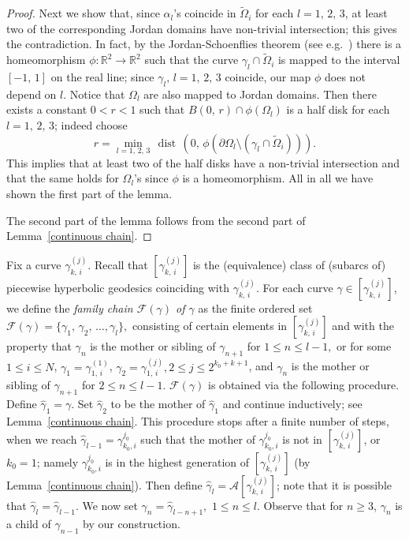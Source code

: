 \documentclass[reqno,11pt]{amsart}
\def\az{\alpha}
\def\dist{{\mathop\mathrm{\,dist\,}}}
\def\wz{\widetilde}
\numberwithin{equation}{section}
\theoremstyle{remark}
\begin{document}
\begin{proof}
Next we show that, since $\az_l$'s coincide in $\wz \Omega_i$ for each $l=1,\,2,\,3$, at least two of the corresponding Jordan domains have non-trivial intersection; this gives the contradiction. In fact, by the Jordan-Schoenflies theorem (see e.g.\ \cite{T1992}) there is a homeomorphism 
$\phi\colon\mathbb R^2\to\mathbb R^2$ such that the curve $\gamma_l\cap \wz \Omega_i$ is mapped to the  interval $[-1,\,1]$ on the real line; since $\gamma_l,\,l=1,\,2,\,3$ coincide, our map $\phi$ does not depend on $l$. Notice that $\Omega_l$ are also mapped to Jordan domains. Then there exists a constant $0<r<1$ such that $B(0,\,r)\cap \phi(\Omega_l)$ is a half disk for each $l=1,\,2,\,3$; indeed choose
$$r=\min_{l=1,\,2,\,3} \dist\left(0,\,\phi(\partial \Omega_l \setminus (\gamma_l\cap \wz \Omega_i))\right).$$
This implies that at least two of the half disks have a non-trivial intersection and that the same holds for $\Omega_l$'s since $\phi$ is a homeomorphism. 
All in all we have shown the first part of the lemma. 


The second part of the lemma follows from the second part of  Lemma~\ref{continuous chain}.
\end{proof}



Fix a curve $\gamma_{k,\,i}^{(j)}$. Recall that $[\gamma_{k,\,i}^{(j)}]$ is  the (equivalence) class of  (subarcs of) piecewise hyperbolic geodesics coinciding with $\gamma_{k,\,i}^{(j)}$. 
For each curve $\gamma\in [\gamma_{k,\,i}^{(j)}]$, we define the {\it family chain $\mathcal F(\gamma)$ of $\gamma$} as the finite ordered set  $\mathcal F(\gamma)=\{\gamma_1,\,\gamma_2 ,\, \dots, \gamma_l\},$ consisting of certain elements in $[\gamma_{k,\,i}^{(j)}]$ and
with the property that $\gamma_{n}$ is the mother or sibling of $\gamma_{n+1}$ for  
$1\le n\le l-1,$
or for some $1\le i\le N$, $\gamma_1=\gamma_{1,\,i}^{(1)}$,  $\gamma_2=\gamma_{1,\,i}^{(j)}, 2\le j\le 2^{k_0+k+1}$, and  $\gamma_{n}$ is the mother or sibling of $\gamma_{n+1}$ for  
$2\le n\le l-1.$
$\mathcal F(\gamma)$ is obtained
via the following procedure. Define $\hat \gamma_1=  \gamma.$
Set $\hat \gamma_2$  to be the mother of $\hat \gamma_1$ 
and continue inductively; see Lemma~\ref{continuous chain}. 
This procedure stops after a finite number of steps,
when we reach $\hat \gamma_{l-1}=\gamma_{k_0,i}^{j_0}$ such that the mother of $\gamma_{k_0,i}^{j_0}$ is not in  $[\gamma_{k,\,i}^{(j)}]$, or $k_0=1$; namely $\gamma_{k_0,i}^{j_0}$ is in the highest generation of $[\gamma_{k,\,i}^{(j)}]$ (by Lemma~\ref{continuous chain}). 
Then define $\hat \gamma_{l}=\mathcal A[\gamma_{k,\,i}^{(j)}]$; note that it is possible that $\hat \gamma_{l}=\hat \gamma_{l-1}$. 
We now set $\gamma_n=
\hat \gamma_{l-n+1},$ $1\le n \le l.$ Observe that for $n\ge 3$, $\gamma_n$ is a child of $\gamma_{n-1}$ by our construction. 
\end{document}
